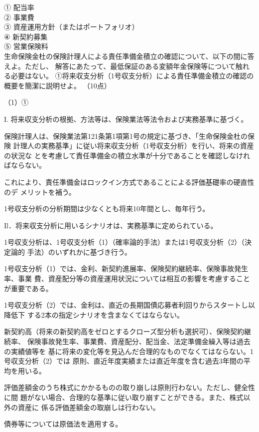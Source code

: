 \documentclass[report,gutter=10mm,fore-edge=10mm,uplatex,dvipdfmx]{jlreq}
\begin{document}
\answer{}

① 配当率\\
② 事業費 \\
③ 資産運用方針（またはポートフォリオ） \\
④ 新契約募集 \\
⑤ 営業保険料 \\

生命保険金杜の保険計理人による責任準備金積立の確認について、以下の間に答えよ。ただし、
解答にあたって、最低保証のある変額年金保険等について触れる必要はない。
①将来収支分析（1号収支分析）による責任準備金積立の確認の概要を簡潔に説明せよ。
（10点）

\answer{}
（1）①

I. 将来収支分析の根拠、方法等は、保険業法等法令および実務基準に基づく。

保険計理人は、保険業法第121条第1項第1号の規定に基づき、「生命保険金杜の保険
計理人の実務基準」に従い将来収支分析（1号収支分析）を行い、将来の資産の状況な
とを考慮して責任準備金の積立水準が十分であることを確認しなければならない。

これにより、責任準備金はロックイン方式であることによる評価基礎率の硬直性のデ
メリットを補う。

1号収支分析の分析期間は少なくとも将来10年間とし、毎年行う。

Il．将来収支分析に用いるシナリオは、実務基準に定められている。

1号収支分析は、1号収支分析（1）（確率論的手法）または1号収支分析（2）（決定論的
手法）のいずれかに基づき行う。

1号収支分析（1）では、金利、新契約進展率、保険契約継続率、保険事故発生率、事業
費、資産配分等の資産運用状況については相互の影響を考慮することが重要である。

1号収支分析（2）では、金利は、直近の長期国債応募者利回りからスタートし以降低下
する2本の指定シナリオを含まなくてはならない。

新契約高（将来の新契約高をゼロとするクローズ型分析も選択可）、保険契約継続率、
保険事故発生率、事業費、資産配分、配当金、法定準備金繰入等は過去の実績値等を
基に将来の変化等を見込んだ合理的なものでなくてはならない。1号収支分析（2）では
原則、直近年度実績または直近年度を含む過去3年間の平均を用いる。

評価差額金のうち株式にかかるものの取り崩しは原則行わない。ただし、健全性に間
題がない場合、合理的な基準に従い取り崩すことができる。また、株式以外の資産に
係る評価差額金の取崩しは行わない。

債券等については原価法を適用する。
\end{document}

